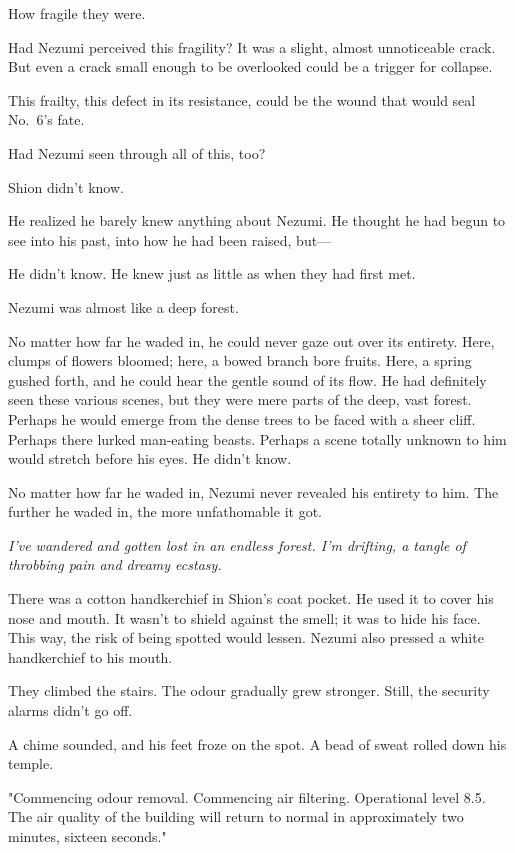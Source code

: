 How fragile they were.

Had Nezumi perceived this fragility? It was a slight, almost
unnoticeable crack. But even a crack small enough to be overlooked could
be a trigger for collapse.

This frailty, this defect in its resistance, could be the wound that
would seal No.~6's fate.

Had Nezumi seen through all of this, too?

Shion didn't know.

He realized he barely knew anything about Nezumi. He thought he had
begun to see into his past, into how he had been raised, but---

He didn't know. He knew just as little as when they had first met.

Nezumi was almost like a deep forest.

No matter how far he waded in, he could never gaze out over its
entirety. Here, clumps of flowers bloomed; here, a bowed branch bore
fruits. Here, a spring gushed forth, and he could hear the gentle sound
of its flow. He had definitely seen these various scenes, but they were
mere parts of the deep, vast forest. Perhaps he would emerge from the
dense trees to be faced with a sheer cliff. Perhaps there lurked
man-eating beasts. Perhaps a scene totally unknown to him would stretch
before his eyes. He didn't know.

No matter how far he waded in, Nezumi never revealed his entirety to
him. The further he waded in, the more unfathomable it got.

\emph{I've wandered and gotten lost in an endless forest. I'm drifting, a
tangle of throbbing pain and dreamy ecstasy.}

\mybreak

There was a cotton handkerchief in Shion's coat pocket. He used it to
cover his nose and mouth. It wasn't to shield against the smell; it was
to hide his face. This way, the risk of being spotted would lessen.
Nezumi also pressed a white handkerchief to his mouth.

They climbed the stairs. The odour gradually grew stronger. Still, the
security alarms didn't go off.

A chime sounded, and his feet froze on the spot. A bead of sweat rolled
down his temple.

"Commencing odour removal. Commencing air filtering. Operational level
8.5. The air quality of the building will return to normal in
approximately two minutes, sixteen seconds."

